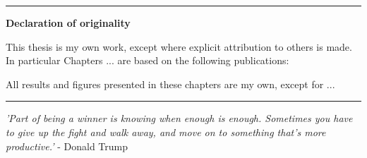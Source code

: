 \begin{titlepage}
\begin{vcenterpage}
\noindent\rule[2pt]{\textwidth}{0.5pt}
\begin{center}
{\large\textbf{Declaration of originality}}
\end{center}
This thesis is my own work, except where explicit attribution to others is made. In particular Chapters ... are based on the following publications:

All results and figures presented in these chapters are my own, except for ...

\noindent\rule[2pt]{\textwidth}{0.5pt}
\end{vcenterpage}

\cleardoublepage

\thispagestyle{empty}

\begin{center}
  \emph{'Part of being a winner is knowing when enough is enough. Sometimes you have to give up the fight and walk away, and move on to something that's more productive.'} - Donald Trump
\end{center}

{}


\end{titlepage}
\sloppy

\titlepage
